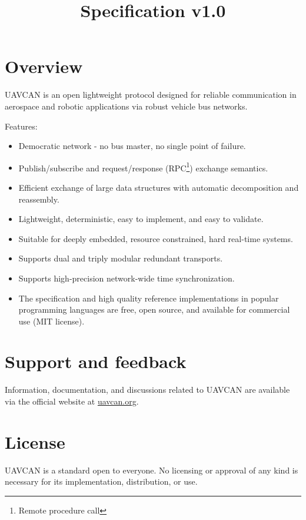 \documentclass{uavcandoc}
\title{Specification v1.0}
\begin{document}
\frontmatter

\begin{titlepage}

\section*{Overview}

UAVCAN is an open lightweight protocol designed for reliable communication in aerospace and robotic applications via
robust vehicle bus networks.

Features:

\begin{itemize}
    \item Democratic network - no bus master, no single point of failure.
    \item Publish/subscribe and request/response (RPC\footnote{Remote procedure call}) exchange semantics.
    \item Efficient exchange of large data structures with automatic decomposition and reassembly.
    \item Lightweight, deterministic, easy to implement, and easy to validate.
    \item Suitable for deeply embedded, resource constrained, hard real-time systems.
    \item Supports dual and triply modular redundant transports.
    \item Supports high-precision network-wide time synchronization.
    \item The specification and high quality reference implementations in popular programming languages are free,
    open source, and available for commercial use (MIT license).
\end{itemize}

\BeginRightColumn

\section*{Support and feedback}

Information, documentation, and discussions related to UAVCAN are available via the official website at
\href{http://uavcan.org}{uavcan.org}.

\section*{License}

UAVCAN is a standard open to everyone.
No licensing or approval of any kind is necessary for its implementation, distribution, or use.


\end{titlepage}
\end{document}
